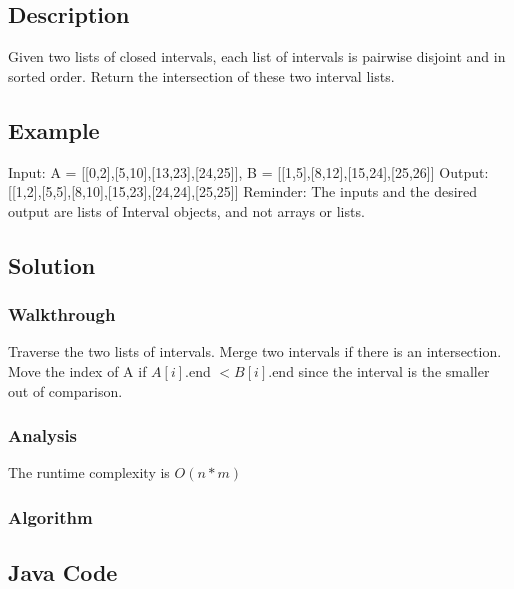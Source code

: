\documentclass[]{book}
\begin{document}
\hypertarget{description-21}{%
\subsection{Description}\label{description-21}}

Given two lists of closed intervals, each list of intervals is pairwise disjoint and in sorted order.
Return the intersection of these two interval lists.

\hypertarget{example-20}{%
\subsection{Example}\label{example-20}}

Input: A = {[}{[}0,2{]},{[}5,10{]},{[}13,23{]},{[}24,25{]}{]}, B = {[}{[}1,5{]},{[}8,12{]},{[}15,24{]},{[}25,26{]}{]}
Output: {[}{[}1,2{]},{[}5,5{]},{[}8,10{]},{[}15,23{]},{[}24,24{]},{[}25,25{]}{]}
Reminder: The inputs and the desired output are lists of Interval objects, and not arrays or lists.

\hypertarget{solution-16}{%
\subsection{Solution}\label{solution-16}}

\hypertarget{walkthrough-20}{%
\subsubsection{Walkthrough}\label{walkthrough-20}}

Traverse the two lists of intervals. Merge two intervals if there is an intersection. Move the index of A if
\(A[i]\).end \(< B[i]\).end since the interval is the smaller out of comparison.

\hypertarget{analysis-22}{%
\subsubsection{Analysis}\label{analysis-22}}

The runtime complexity is \(O(n * m)\)

\hypertarget{algorithm-22}{%
\subsubsection{Algorithm}\label{algorithm-22}}

\hypertarget{java-code-18}{%
\subsection{Java Code}\label{java-code-18}}
\end{document}

